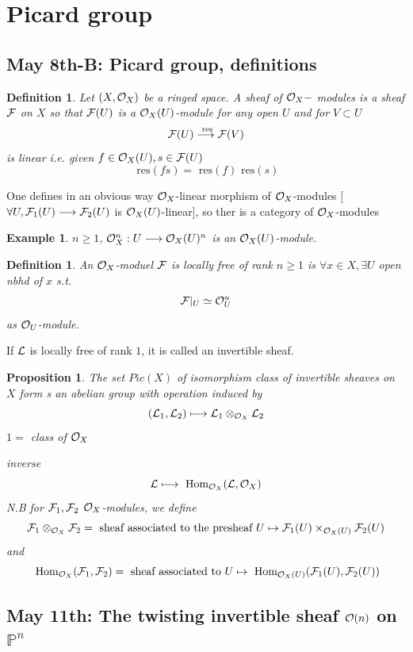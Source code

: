 \documentclass[11pt]{article}
\newtheorem{prop}[thm]{Proposition}
\newtheorem{dfn}[thm]{Definition}
\newtheorem{ex}[thm]{Example}
\renewcommand{\hom}{\text{ Hom}}
\newcommand{\res}{\text{ res}}
\newcommand{\proj}{\mathbb P}
\newcommand{\calf}{{\cal F}}
\newcommand{\call}{{\cal L}}
\newcommand{\calo}{{\cal O}}
\newcommand{\lrta}{\longrightarrow}
\begin{document}
\section{Picard group}
\subsection{May 8th-B: Picard group, definitions}
\begin{dfn}
Let $(X,\calo_X)$ be a ringed space. A sheaf of $\calo_X-$ modules is a sheaf
$\calf$ on $X$ so that $\calf(U)$ is a $\calo_X(U)$-module for any open $U$ and for $V\subset U$
$$
\calf(U)\overset{\res}{\lrta}\calf(V)
$$
is linear i.e. given $f\in \calo_X(U), s\in \calf(U)$
$$
\res (f s)=\res(f)\res(s)
$$
\end{dfn}

One defines in an obvious way $\calo_X$-linear morphism of $\calo_X$-modules
[$\forall U, \calf_1(U)\lrta\calf_2(U)$ is $\calo_X(U)$-linear], so ther is a category of $\calo_X$-modules
\begin{ex}
$n\geq 1$, $\calo_X^n:U\lrta \calo_X(U)^n$ is an $\calo_X(U)$-module. 
\end{ex}
\begin{dfn}
An $\calo_X$-moduel $\calf$ is locally free of rank $n\geq 1$ is $\forall x\in X,\exists U $ open nbhd of $x $ s.t.
$$
\calf|_U\simeq \calo_U^u
$$
as $\calo_U$-module.
\end{dfn}

If $\call$ is  locally free of rank $1$, it is called an invertible sheaf.
\begin{prop}
The set $Pic(X)$ of isomorphism class of invertible sheaves on $X$ form s an abelian group with operation induced by 
$$
(\call_1,\call_2)\longmapsto \call_1\otimes_{\calo_X}\call_2
$$
$1=$ class of $\calo_X$

inverse
$$
\call\longmapsto \hom_{\calo_X}(\call,\calo_X)
$$
N.B for $\calf_1,\calf_2$ $\calo_X$-modules, we define
$$
\calf_1\otimes_{\calo_X}\calf_2=\text{ sheaf associated to  the presheaf $U\mapsto \calf_1(U)\times_{\calo_X(U)}\calf_2(U)$}
$$
and
$$
\hom_{\calo_X}(\calf_1,\calf_2)=\text{ sheaf associated to $U\mapsto \hom_{\calo_X(U)}(\calf_1(U),\calf_2(U))$}
$$
\end{prop}


\subsection{May 11th: The twisting invertible sheaf $\calo(n)$ on $\proj^n$}
\end{document}
